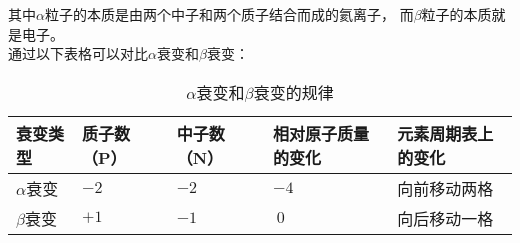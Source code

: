 \documentclass[UTF8]{ctexart}
\begin{document}
    其中$\alpha$粒子的本质是由两个中子和两个质子结合而成的氦离子，
    而$\beta$粒子的本质就是电子。\\[3mm]
    通过以下表格可以对比$\alpha$衰变和$\beta$衰变：\vspace{3pt}
    \begin{table}[h]
        \begin{center}
            \begin{tabular}{l|l|l|l|l}
                \hline
                衰变类型\qquad&质子数（P）\qquad&中子数（N）\qquad&相对原子质量的变化\qquad&元素周期表上的变化\\ \hline
                $\alpha$衰变&$-2$&$-2$&$-4$&向前移动两格\\ \hline
                $\beta$衰变&$+1$&$-1$&$~0$&向后移动一格\\ \hline
            \end{tabular}
            \caption{$\alpha$衰变和$\beta$衰变的规律}
        \end{center}
    \end{table}\vspace{-20pt}
\end{document}

